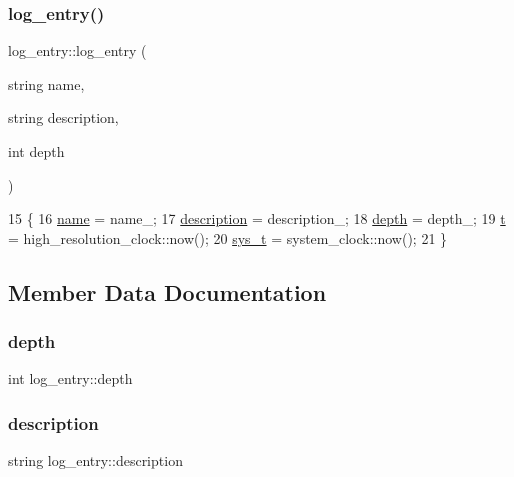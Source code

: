 \subsubsection{\texorpdfstring{log\+\_\+entry()}{log\_entry()}}
{\footnotesize\ttfamily log\+\_\+entry\+::log\+\_\+entry (\begin{DoxyParamCaption}\item[{string}]{name,  }\item[{string}]{description,  }\item[{int}]{depth }\end{DoxyParamCaption})}


\begin{DoxyCode}
15                                                                  \{
16   \hyperlink{classlog__entry_ac65943b778a5978a579d984a6b682def}{name} = name\_;
17   \hyperlink{classlog__entry_a35acb4013a550dd9926c6cccd93300dd}{description} = description\_;
18   \hyperlink{classlog__entry_abfcc98c447997da2eb424a73f5f06da4}{depth} = depth\_;
19   \hyperlink{classlog__entry_a9477b6872dfa3609db1e4e6a97ed5dba}{t} = high\_resolution\_clock::now();
20   \hyperlink{classlog__entry_a2877798c71ba0f0762b821633c8bc517}{sys\_t} = system\_clock::now();
21 \}
\end{DoxyCode}


\subsection{Member Data Documentation}
\mbox{\label{classlog__entry_abfcc98c447997da2eb424a73f5f06da4}} 
\subsubsection{\texorpdfstring{depth}{depth}}
{\footnotesize\ttfamily int log\+\_\+entry\+::depth}

\mbox{\label{classlog__entry_a35acb4013a550dd9926c6cccd93300dd}} 
\subsubsection{\texorpdfstring{description}{description}}
{\footnotesize\ttfamily string log\+\_\+entry\+::description}

